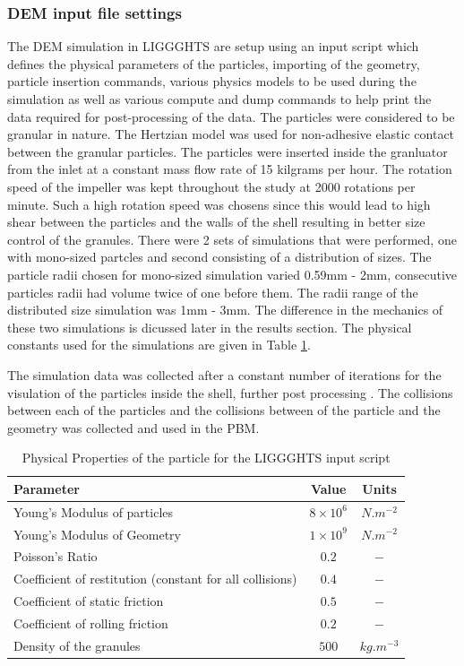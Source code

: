 \documentclass[preprint,11pt,authoryear]{elsarticle}
\begin{document}
\subsubsection{DEM input file settings}
\par The DEM simulation in LIGGGHTS are setup using an input script which defines the physical 
parameters of the particles, importing of the geometry, particle insertion commands, various physics 
models to be used during the simulation as well as various compute and dump commands to help print 
the data required for post-processing of the data. The particles were considered to be granular in 
nature. The Hertzian model was used for non-adhesive elastic contact between the granular particles. 
The particles were inserted inside the granluator from the inlet at a constant mass flow rate of 15 
kilgrams per hour. The rotation speed of the impeller was kept throughout the study at 2000 rotations 
per minute. Such a high rotation speed was chosens since this would lead to high shear between the 
particles and the walls of the shell resulting in better size control of the granules. There were 2 sets of 
simulations that were performed, one with mono-sized partcles and second consisting of a distribution 
of sizes. The particle radii chosen for mono-sized simulation varied 0.59mm - 2mm, consecutive 
particles radii had volume twice of one before them. The radii range of the distributed size simulation 
was 1mm - 3mm. The difference in the mechanics of these two simulations is dicussed later in the 
results section. The physical constants used for the simulations are given in Table 
\ref{table:mthds_dem_input}.
\par The simulation data was collected after a constant number of iterations for the visulation of the 
particles inside the shell, further post processing . The collisions between each of the particles and the 
collisions between of the particle and the geometry was collected and used in the PBM. 

\begin{table}[!htb]%
\caption{Physical Properties of the particle for the LIGGGHTS input script} 
\label{table:mthds_dem_input}
\begin{center}
\begin{tabular}{l|c|c}
\hline
\bf{Parameter} &\bf{Value} &\bf{Units}\\
\hline
Young's Modulus of particles  & $8 \times 10^{6}$ & $N.m^{-2}$\\
Young's Modulus of Geometry  & $1 \times 10^{9}$ & $N.m^{-2}$\\
Poisson's Ratio & $0.2$ & $-$\\
Coefficient of restitution (constant for all collisions) & $0.4$ & $-$\\
Coefficient of static friction & $0.5$ & $-$\\
Coefficient of rolling friction  & $0.2$ & $-$\\
Density of the granules & $500$ & $kg.m^{-3}$\\
\hline
\end{tabular}
\end{center}
\end{table}
\end{document}
